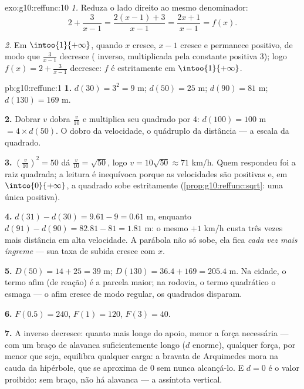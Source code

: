 \begin{solution}{exo:g10:reffunc:10}
\emph{1.} Reduza o lado direito ao mesmo denominador:
\[
2 + \frac{3}{x-1} = \frac{2(x-1) + 3}{x - 1} = \frac{2x + 1}{x - 1}
= f(x).
\]

\emph{2.} Em $\intoo{1}{+\infty}$, quando $x$ cresce, $x - 1$ cresce e
permanece positivo, de modo que $\frac{3}{x-1}$ decresce ( inverso,
multiplicada pela constante positiva $3$); logo
$f(x) = 2 + \frac{3}{x-1}$ decresce: $f$ é estritamente  em
$\intoo{1}{+\infty}$.
\end{solution}

\begin{solution}{pb:g10:reffunc:1}
\textbf{1.} $d(30) = 3^2 = 9$ m; $d(50) = 25$ m; $d(90) =
81$ m; $d(130) = 169$ m.

\textbf{2.} Dobrar $v$ dobra $\frac v{10}$ e multiplica seu
quadrado por $4$: $d(100) = 100$ m $= 4 \times d(50)$. O dobro
da velocidade, o quádruplo da distância --- a escala da 
quadrado.

\textbf{3.} $\left(\frac{v}{10}\right)^2 = 50$ dá
$\frac{v}{10} = \sqrt{50}$, logo $v = 10\sqrt{50} \approx 71$
km/h. Quem respondeu foi a raiz quadrada; a leitura é
inequívoca porque as velocidades são positivas e, em
$\intco{0}{+\infty}$, a  quadrado sobe estritamente
(\cref{prop:g10:reffunc:sqrt}: uma única  positiva).

\textbf{4.} $d(31) - d(30) = 9.61 - 9 = 0.61$ m, enquanto
$d(91) - d(90) = 82.81 - 81 = 1.81$ m: o mesmo $+1$ km/h custa
três vezes mais distância em alta velocidade. A parábola não só
sobe, ela fica \emph{cada vez mais íngreme} --- sua taxa de
subida cresce com $x$.

\textbf{5.} $D(50) = 14 + 25 = 39$ m; $D(130) = 36.4 + 169 =
205.4$ m. Na cidade, o termo afim (de reação) é a parcela
maior; na rodovia, o termo quadrático o esmaga --- o afim
cresce de modo regular, os quadrados disparam.

\textbf{6.} $F(0.5) = 240$, $F(1) = 120$, $F(3) = 40$.

\textbf{7.} A  inverso decresce: quanto mais longe do
apoio, menor a força necessária --- com um braço de alavanca
suficientemente longo ($d$ enorme), qualquer força, por menor
que seja, equilibra qualquer carga: a bravata de Arquimedes
mora na cauda da hipérbole, que se aproxima de $0$ sem nunca
alcançá-lo. E $d = 0$ é o valor proibido: sem braço, não há
alavanca --- a assíntota vertical.


\end{solution}
